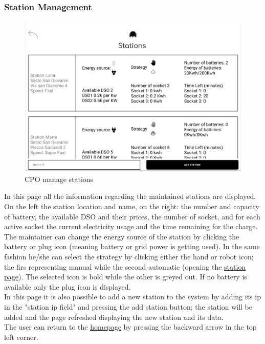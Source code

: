 \subsubsection{Station Management}
\begin{figure}[H]
    \centering
    \includegraphics[keepaspectratio, width=15cm]{Mockup/CPMSSiteInterface/Add Station.png}
    \caption{\ac{CPO} manage stations}
    \label{cpo:Station}
\end{figure}
In this page all the information regarding the maintained stations are displayed. On the left the station location and name, on the right:
the number and capacity of battery, the available DSO and their prices, the number of socket, and for each active socket the current electricity usage and the time remaining for the charge.\\
The maintainer can change the energy source of the station by clicking the battery or plug icon (meaning battery or grid power is getting used). In the same fashion he/she can select the strategy by clicking either the hand or robot icon; the firs representing manual while the second automatic (opening the \hyperref[cpo:Station]{station page}).
The selected icon is bold while the other is greyed out. If no battery is available only the plug icon is displayed.\\
In this page it is also possible to add a new station to the system by adding its ip in the "station ip field" and pressing the add station button; the station will be added and the page refreshed displaying the new station and its data.\\
The user can return to the \hyperref[cpo:Homepage]{homepage} by pressing the backward arrow in the top left corner.

